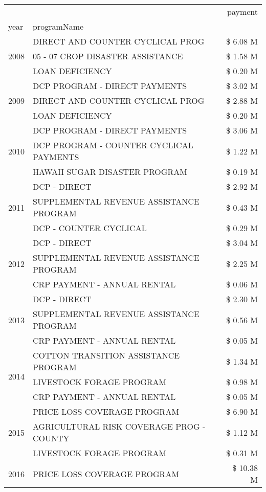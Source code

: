 \begin{tabular}{llr}
\toprule
 &  & payment \\
year & programName &  \\
\midrule
\multirow[t]{3}{*}{2008} & DIRECT AND COUNTER CYCLICAL PROG & \$ 6.08 M \\
 & 05 - 07 CROP DISASTER ASSISTANCE & \$ 1.58 M \\
 & LOAN DEFICIENCY & \$ 0.20 M \\
\cline{1-3}
\multirow[t]{3}{*}{2009} & DCP PROGRAM - DIRECT PAYMENTS & \$ 3.02 M \\
 & DIRECT AND COUNTER CYCLICAL PROG & \$ 2.88 M \\
 & LOAN DEFICIENCY & \$ 0.20 M \\
\cline{1-3}
\multirow[t]{3}{*}{2010} & DCP PROGRAM - DIRECT PAYMENTS & \$ 3.06 M \\
 & DCP PROGRAM - COUNTER CYCLICAL PAYMENTS & \$ 1.22 M \\
 & HAWAII SUGAR DISASTER PROGRAM & \$ 0.19 M \\
\cline{1-3}
\multirow[t]{3}{*}{2011} & DCP - DIRECT & \$ 2.92 M \\
 & SUPPLEMENTAL REVENUE ASSISTANCE PROGRAM & \$ 0.43 M \\
 & DCP - COUNTER CYCLICAL & \$ 0.29 M \\
\cline{1-3}
\multirow[t]{3}{*}{2012} & DCP - DIRECT & \$ 3.04 M \\
 & SUPPLEMENTAL REVENUE ASSISTANCE PROGRAM & \$ 2.25 M \\
 & CRP PAYMENT - ANNUAL RENTAL & \$ 0.06 M \\
\cline{1-3}
\multirow[t]{3}{*}{2013} & DCP - DIRECT & \$ 2.30 M \\
 & SUPPLEMENTAL REVENUE ASSISTANCE PROGRAM & \$ 0.56 M \\
 & CRP PAYMENT - ANNUAL RENTAL & \$ 0.05 M \\
\cline{1-3}
\multirow[t]{3}{*}{2014} & COTTON TRANSITION ASSISTANCE PROGRAM & \$ 1.34 M \\
 & LIVESTOCK FORAGE PROGRAM & \$ 0.98 M \\
 & CRP PAYMENT - ANNUAL RENTAL & \$ 0.05 M \\
\cline{1-3}
\multirow[t]{3}{*}{2015} & PRICE LOSS COVERAGE PROGRAM & \$ 6.90 M \\
 & AGRICULTURAL RISK COVERAGE PROG - COUNTY & \$ 1.12 M \\
 & LIVESTOCK FORAGE PROGRAM & \$ 0.31 M \\
\cline{1-3}
\multirow[t]{3}{*}{2016} & PRICE LOSS COVERAGE PROGRAM                   & \$ 10.38 M \\

\end{tabular}
